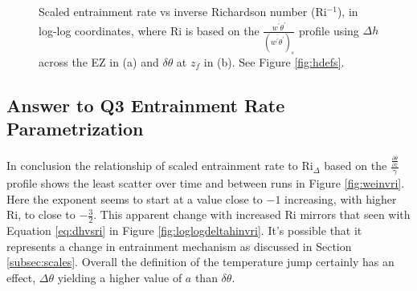 \begin{figure}[htbp]
\begin{minipage}[b]{0.5\linewidth}
        \\
        \end{minipage}             
\quad
\begin{minipage}[b]{0.5\linewidth}
        \\
       
       \end{minipage}
        \caption[Scaled entrainment rate vs inverse Richardson number (ii)]{Scaled entrainment rate vs inverse Richardson number (\acs{Ri}$^{-1}$), in log-log coordinates, where \acs{Ri} is based on the $\frac{\overline{w^{'}\theta^{'}}}{(\overline{w^{'}\theta^{'}})_{s}}$
profile using $\Delta h$ across the \acs{EZ} in (a) and $\delta \theta$ at $z_{f}$ in (b).  See Figure \ref{fig:hdefs}.}
        \label{fig:weinvri_f}
\end{figure}

\subsection{Answer to Q3 Entrainment Rate Parametrization}
In conclusion the relationship of scaled entrainment rate to \acs{Ri}$_{\Delta}$ based on the $\frac{\frac{\partial \overline{\theta}}{\partial z}}{\gamma}$ profile shows the least scatter over time and between runs in Figure \ref{fig:weinvri}.  Here the exponent seems to start at a value close to $-1$ increasing, with higher \acs{Ri}, to close to $-\frac{3}{2}$.  This apparent change with increased \acs{Ri} mirrors that seen with Equation \ref{eq:dhvsri} in Figure \ref{fig:loglogdeltahinvri}.  It's possible that it represents a change in entrainment mechanism as discussed in Section \ref{subsec:scales}.  Overall the definition of the temperature jump certainly has an effect, $\Delta \theta$ yielding a higher value of $a$ than $\delta \theta$.

\endinput

Any text after an \endinput is ignored.
You could put scraps here or things in progress.
